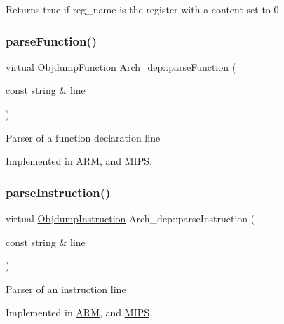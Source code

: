 Returns true if reg\+\_\+name is the register with a content set to 0 \mbox{\label{classArch__dep_a5d004c41d6eaf7975b69f767a52d2e30}} 
\subsubsection{\texorpdfstring{parse\+Function()}{parseFunction()}}
{\footnotesize\ttfamily virtual \hyperlink{classObjdumpFunction}{Objdump\+Function} Arch\+\_\+dep\+::parse\+Function (\begin{DoxyParamCaption}\item[{const string \&}]{line }\end{DoxyParamCaption})\hspace{0.3cm}{\ttfamily [pure virtual]}}

Parser of a function declaration line 

Implemented in \hyperlink{classARM_a0f6b3ef390259fd4754cab9752609a20}{A\+RM}, and \hyperlink{classMIPS_a03874bd0a2a980e174ea447482a830c3}{M\+I\+PS}.

\mbox{\label{classArch__dep_a6408104eb77881932f05dab9e913ca87}} 
\subsubsection{\texorpdfstring{parse\+Instruction()}{parseInstruction()}}
{\footnotesize\ttfamily virtual \hyperlink{classObjdumpInstruction}{Objdump\+Instruction} Arch\+\_\+dep\+::parse\+Instruction (\begin{DoxyParamCaption}\item[{const string \&}]{line }\end{DoxyParamCaption})\hspace{0.3cm}{\ttfamily [pure virtual]}}

Parser of an instruction line 

Implemented in \hyperlink{classARM_a386a5c3f261a13e7b4a5cd4a5b08f289}{A\+RM}, and \hyperlink{classMIPS_a8a3bbe0cf81cf032f3e8e1d1786c888f}{M\+I\+PS}.

\mbox{\label{classArch__dep_abf6d4090f19269e8718b2597984f52e7}} 
